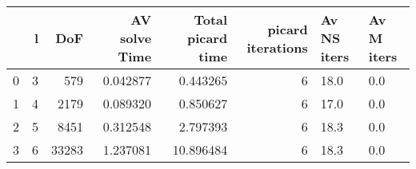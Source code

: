 \begin{tabular}{lrrrrrll}
\toprule
{} &  l &    DoF &  AV solve Time &  Total picard time &  picard iterations & Av NS iters & Av M iters \\
\midrule
0 &  3 &    579 &       0.042877 &           0.443265 &                  6 &        18.0 &        0.0 \\
1 &  4 &   2179 &       0.089320 &           0.850627 &                  6 &        17.0 &        0.0 \\
2 &  5 &   8451 &       0.312548 &           2.797393 &                  6 &        18.3 &        0.0 \\
3 &  6 &  33283 &       1.237081 &          10.896484 &                  6 &        18.3 &        0.0 \\
\bottomrule
\end{tabular}
